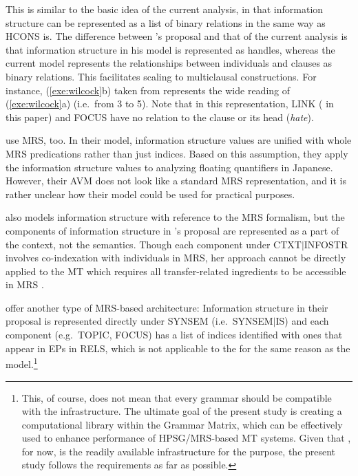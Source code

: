 \noindent This is similar to the basic idea of the current analysis,
in that information structure can be represented as a list of binary
relations in the same way as HCONS is. The
difference between \citeauthor{wilcock:05}'s proposal and that of the
current analysis is that information structure in his model is
represented as handles, whereas the current model represents the
relationships between individuals and clauses as binary
relations. This facilitates scaling to multiclausal constructions. For
instance, (\ref{exe:wilcock}b) taken from \citet[275]{wilcock:05}
represents the wide  reading of (\ref{exe:wilcock}a)
(i.e.\ from 3 to 5). Note that in this representation, LINK
( in this paper) and FOCUS have no relation to the clause
or its head (\textit{hate}).





\citet{yoshimoto:etal:06} use MRS, too. In their model,
information structure values are unified with whole MRS predications
rather than just indices. Based on this assumption, they apply the
information structure values to analyzing floating quantifiers in
Japanese.  However, their AVM does not look like a standard MRS
representation, and it is rather unclear how their model could be used
for practical purposes.



\citet{paggio:09} also models information structure with reference to
the MRS formalism, but the components of information structure in
\citeauthor{paggio:09}'s proposal are represented as a part of the
context, not the semantics. Though each component under
CTXT\ensuremath{\mid}INFOSTR involves co-indexation with individuals
in MRS, her approach cannot be directly applied to the \isi{\logon} MT
 which requires all transfer-related ingredients
to be accessible in MRS \citep{oepen:etal:07}.



\citet{bildhauer:cook:10} offer another type of MRS-based
architecture: Information structure in their proposal is
represented directly under SYNSEM (i.e.\ SYNSEM\ensuremath{\mid}IS)
and each component (e.g.\ TOPIC, FOCUS) has a list of indices
identified with ones that appear in EPs in RELS, which is not
applicable to the \isi{\logon}  for the same
reason as the \citet{paggio:09} model.\footnote{This, of course, does
  not mean that every grammar should be compatible with the
  \isi{\logon} infrastructure. The ultimate goal of the present study
  is creating a computational library within the Grammar Matrix, which
  can be effectively used to enhance performance of HPSG/MRS-based MT
  systems. Given that \isi{\logon}, for now, is the readily available
  infrastructure for the purpose, the present study follows the
  requirements as far as possible.}



